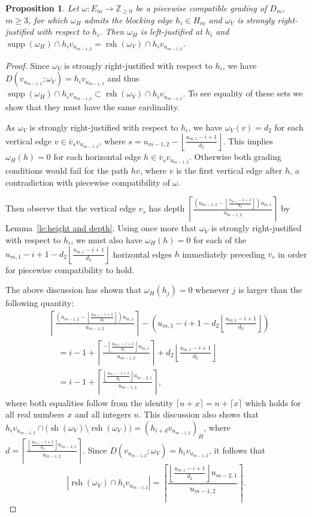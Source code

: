 \documentclass[10pt]{amsart}
\newtheorem{proposition}[theorem]{Proposition}
\theoremstyle{definition}
\newcommand{\ZZ}{\mathbb{Z}}
\DeclareMathOperator{\supp}{supp}
\DeclareMathOperator{\rsh}{rsh}
\DeclareMathOperator{\sh}{sh}
\begin{document}
\begin{proposition}
 \label{prop:strong justification implication}
 Let $\omega:E_m\to\ZZ_{\ge0}$ be a piecewise compatible grading of $D_m$, $m\ge3$, for which $\omega_H$ admits the blocking edge $h_i\in H_m$ and $\omega_V$ is strongly right-justified with respect to $h_i$.
 Then $\omega_H$ is left-justified at $h_i$ and $\supp(\omega_H)\cap h_iv_{u_{m-1,2}}=\rsh(\omega_V)\cap h_iv_{u_{m-1,2}}$.
\end{proposition}
\begin{proof}
 Since $\omega_V$ is strongly right-justified with respect to $h_i$, we have $D(v_{u_{m-1,2}};\omega_V)=h_iv_{u_{m-1,2}}$ and thus $\supp(\omega_H)\cap h_iv_{u_{m-1,2}}\subset\rsh(\omega_V)\cap h_iv_{u_{m-1,2}}$.
 To see equality of these sets we show that they must have the same cardinality.

 As $\omega_V$ is strongly right-justified with respect to $h_i$, we have $\omega_V(v)=d_2$ for each vertical edge $v\in\overline{v}_sv_{u_{m-1,2}}$, where $s=u_{m-1,2}-\left\lfloor\frac{u_{m,1}-i+1}{d_2}\right\rfloor$.
 This implies $\omega_H(h)=0$ for each horizontal edge $h\in\overline{v}_sv_{u_{m-1,2}}$.
 Otherwise both grading conditions would fail for the path $hv$, where $v$ is the first vertical edge after $h$, a contradiction with piecewise compatibility of $\omega$.

 Then observe that the vertical edge $v_s$ has depth $\left\lceil\frac{\left(u_{m-1,2}-\left\lfloor\frac{u_{m,1}-i+1}{d_2}\right\rfloor\right)u_{m,1}}{u_{m-1,2}}\right\rceil$ by Lemma~\ref{le:height and depth}.
 Using once more that $\omega_V$ is strongly right-justified with respect to $h_i$, we must also have $\omega_H(h)=0$ for each of the $u_{m,1}-i+1-d_2\left\lfloor\frac{u_{m,1}-i+1}{d_2}\right\rfloor$ horizontal edges $h$ immediately preceding $v_s$ in order for piecewise compatibility to hold.

 The above discussion has shown that $\omega_H(h_j)=0$ whenever $j$ is larger than the following quantity:
 \begin{align*}
 &\left\lceil\frac{\left(u_{m-1,2}-\left\lfloor\frac{u_{m,1}-i+1}{d_2}\right\rfloor\right)u_{m,1}}{u_{m-1,2}}\right\rceil-\left(u_{m,1}-i+1-d_2\left\lfloor\frac{u_{m,1}-i+1}{d_2}\right\rfloor\right)\\
 &\quad=i-1+\left\lceil\frac{-\left\lfloor\frac{u_{m,1}-i+1}{d_2}\right\rfloor u_{m,1}}{u_{m-1,2}}\right\rceil+d_2\left\lfloor\frac{u_{m,1}-i+1}{d_2}\right\rfloor\\
 &\quad=i-1+\left\lceil\frac{\left\lfloor\frac{u_{m,1}-i+1}{d_2}\right\rfloor u_{m-2,1}}{u_{m-1,2}}\right\rceil,
 \end{align*}
 where both equalities follow from the identity $\lceil n+x\rceil=n+\lceil x\rceil$ which holds for all real numbers $x$ and all integers $n$.
 This discussion also shows that $h_iv_{u_{m-1,2}}\cap\big(\sh(\omega_V)\setminus\rsh(\omega_V)\big)=(h_{i+d}v_{u_{m-1,2}})_H$, where $d=\left\lceil\frac{\left\lfloor\frac{u_{m,1}-i+1}{d_2}\right\rfloor u_{m-2,1}}{u_{m-1,2}}\right\rceil$. 
 Since $D(v_{u_{m-1,2}};\omega_V)=h_iv_{u_{m-1,2}}$, it follows that 
 \[|\rsh(\omega_V)\cap h_iv_{u_{m-1,2}}|=\left\lceil\frac{\left\lfloor\frac{u_{m,1}-i+1}{d_2}\right\rfloor u_{m-2,1}}{u_{m-1,2}}\right\rceil.\]


\end{proof}
\end{document}
